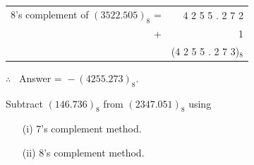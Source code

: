 \begin{solution}
\begin{itemize}
\medskip
\begin{tabular}{rr}
8's complement of $(3522.505)_{8}$ = & 4 2 5 5 . 2 7 2\\
+ & 1\\
\cline{2-2}
 & (4 2 5 5 . 2 7 3)$_{8}$\!\!\!\!
\end{tabular}

$\therefore$~ Answer = ${}-(4255.273)_{8}$.
\end{itemize}
\end{solution}

\begin{problem}\label{prob5.39}
Subtract $(146.736)_{8}$ from $(2347.051)_{8}$ using
\begin{itemize}
\item[(i)] 7's complement method.

\item[(ii)] 8's complement method.
\end{itemize}
\end{problem}

